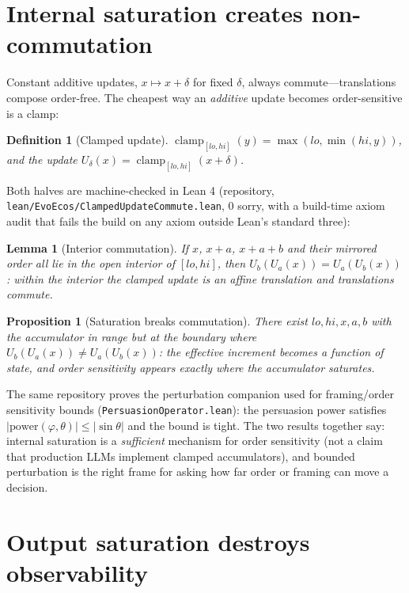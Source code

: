 \documentclass[11pt]{article}
\newtheorem{lemma}{Lemma}
\newtheorem{proposition}{Proposition}
\newtheorem{definition}{Definition}
\begin{document}
\section{Internal saturation creates non-commutation}
\label{sec:lean}

Constant additive updates, $x \mapsto x + \delta$ for fixed $\delta$, always
commute---translations compose order-free. The cheapest way an
\emph{additive} update becomes order-sensitive is a clamp:
\begin{definition}[Clamped update]
$\operatorname{clamp}_{[lo,hi]}(y) = \max(lo, \min(hi, y))$, and the update
$U_\delta(x) = \operatorname{clamp}_{[lo,hi]}(x + \delta)$.
\end{definition}

Both halves are machine-checked in Lean 4 (repository,
\texttt{lean/EvoEcos/ClampedUpdateCommute.lean}, 0 sorry, with a build-time
axiom audit that fails the build on any axiom outside Lean's standard
three):

\begin{lemma}[Interior commutation]
If $x$, $x+a$, $x+a+b$ and their mirrored order all lie in the open interior
of $[lo,hi]$, then $U_b(U_a(x)) = U_a(U_b(x))$: within the interior the
clamped update is an affine translation and translations commute.
\end{lemma}

\begin{proposition}[Saturation breaks commutation]
There exist $lo, hi, x, a, b$ with the accumulator in range but at the
boundary where $U_b(U_a(x)) \neq U_a(U_b(x))$: the effective increment
becomes a function of state, and order sensitivity appears exactly where the
accumulator saturates.
\end{proposition}

The same repository proves the perturbation companion used for
framing/order sensitivity bounds (\texttt{PersuasionOperator.lean}): the
persuasion power satisfies $|\mathrm{power}(\varphi,\theta)| \le |\sin
\theta|$ and the bound is tight. The two results together say: internal
saturation is a \emph{sufficient} mechanism for order sensitivity (not a
claim that production LLMs implement clamped accumulators), and bounded
perturbation is the right frame for asking how far order or framing can move
a decision.

\section{Output saturation destroys observability}
\label{sec:saturation}
\end{document}
